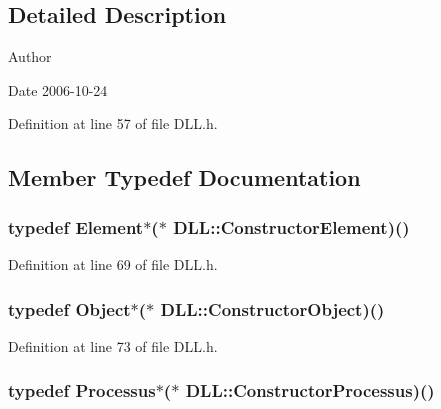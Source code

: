 \subsection{Detailed Description}
\begin{DoxyAuthor}{Author}

\end{DoxyAuthor}
\begin{DoxyDate}{Date}
2006-\/10-\/24 
\end{DoxyDate}


Definition at line 57 of file DLL.h.

\subsection{Member Typedef Documentation}
\hypertarget{classDLL_a7b46644880e5b843144baed79bb2f961}{
\subsubsection[{ConstructorElement}]{\setlength{\rightskip}{0pt plus 5cm}typedef {\bf Element}$\ast$($\ast$ {\bf DLL::ConstructorElement})()}}
\label{classDLL_a7b46644880e5b843144baed79bb2f961}


Definition at line 69 of file DLL.h.\hypertarget{classDLL_a19c89e48f530542f639456f569ede17a}{
\subsubsection[{ConstructorObject}]{\setlength{\rightskip}{0pt plus 5cm}typedef {\bf Object}$\ast$($\ast$ {\bf DLL::ConstructorObject})()}}
\label{classDLL_a19c89e48f530542f639456f569ede17a}


Definition at line 73 of file DLL.h.\hypertarget{classDLL_ad47776a706e85c9bdae28ec91e88b8e8}{
\subsubsection[{ConstructorProcessus}]{\setlength{\rightskip}{0pt plus 5cm}typedef {\bf Processus}$\ast$($\ast$ {\bf DLL::ConstructorProcessus})()}}
\label{classDLL_ad47776a706e85c9bdae28ec91e88b8e8}


